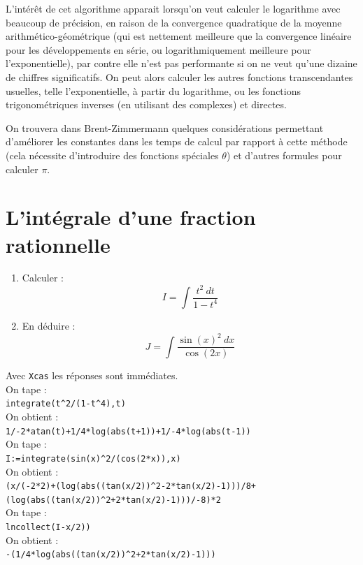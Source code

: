 \documentclass[a4paper,11pt]{book}
\begin{document}
L'int\'er\^et de cet algorithme apparait lorsqu'on veut calculer
le logarithme avec beaucoup de pr\'ecision, en raison de la
convergence quadratique de la moyenne arithm\'etico-g\'eom\'etrique
(qui est nettement meilleure que la convergence lin\'eaire
pour les d\'eveloppements en s\'erie, ou logarithmiquement
meilleure pour l'exponentielle), par contre elle n'est pas
performante si on ne veut qu'une dizaine de chiffres significatifs. 
On peut alors calculer les autres
fonctions transcendantes usuelles, telle l'exponentielle,
\`a partir du logarithme, ou les fonctions trigonom\'etriques
inverses (en utilisant des complexes) et directes.

On trouvera dans Brent-Zimmermann quelques consid\'erations permettant
d'am\'eliorer les constantes dans les temps de calcul par rapport
\`a cette m\'ethode (cela n\'ecessite d'introduire des fonctions 
sp\'eciales $\theta$) et d'autres formules pour calculer $\pi$.

\section{L'int\'egrale d'une fraction rationnelle}
\begin{enumerate}
\item Calculer : 
$$I=\int \frac{t^2\ dt }{1-t^4}$$ 
\item En d\'eduire :
$$J=\int \frac{\sin(x)^2\ dx }{\cos(2x)}$$ 
\end{enumerate}
 Avec {\tt Xcas} les r\'eponses sont imm\'ediates.\\
On tape :\\ 
{\tt integrate(t\verb|^|2/(1-t\verb|^|4),t)}\\ 
On obtient :\\ 
{\tt 1/-2*atan(t)+1/4*log(abs(t+1))+1/-4*log(abs(t-1))}\\ 
On tape :\\ 
{\tt I:=integrate(sin(x)\verb|^|2/(cos(2*x)),x)}\\ 
On obtient :\\ 
{\tt (x/(-2*2)+(log(abs((tan(x/2))\verb|^|2-2*tan(x/2)-1)))/8+}\\
{\tt (log(abs((tan(x/2))\verb|^|2+2*tan(x/2)-1)))/-8)*2}\\
On tape :\\ 
{\tt lncollect(I-x/2))}\\
On obtient :\\
{\tt -(1/4*log(abs((tan(x/2))\verb|^|2+2*tan(x/2)-1)))}\\
\end{document}
